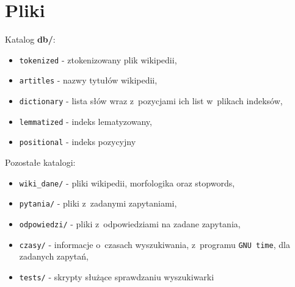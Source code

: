 \documentclass[a4paper,12pt]{article}
\begin{document}
\newpage

\section{Pliki}

Katalog \textbf{db/}:
\begin{itemize}
	\item \texttt{tokenized} - ztokenizowany plik wikipedii,
	\item \texttt{artitles} - nazwy tytułów wikipedii,
	\item \texttt{dictionary} - lista słów wraz z~pozycjami ich list w~plikach
		indeksów,
	\item \texttt{lemmatized} - indeks lematyzowany,
	\item \texttt{positional} - indeks pozycyjny
\end{itemize}

\noindent
Pozostałe katalogi:
\begin{itemize}
	\item \texttt{wiki\_dane/} - pliki wikipedii, morfologika oraz stopwords,
	\item \texttt{pytania/} - pliki z~zadanymi zapytaniami,
	\item \texttt{odpowiedzi/} - pliki z~odpowiedziami na zadane zapytania,
	\item \texttt{czasy/} - informacje o~czasach wyszukiwania, z~programu
		\texttt{GNU time}, dla zadanych zapytań,
	\item \texttt{tests/} - skrypty służące sprawdzaniu wyszukiwarki
\end{itemize}
\end{document}
